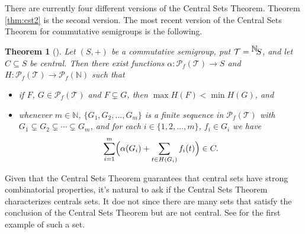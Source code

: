 \documentclass[12pt]{article}
\theoremstyle{plain}
\newtheorem{thm}{Theorem}[section]
\theoremstyle{definition}
\newcommand{\bbN}{\mathbb{N}}
\newcommand{\setfunc}[2]{\hbox{${}^{\hbox{$#1$}}\hskip -2 pt #2$}}
\begin{document}
There are currently four different versions of the Central Sets
Theorem. 
Theorem \ref{thm:cst2} is the second version.
The most recent version of the Central Sets Theorem for
commutative semigroups is the following. 
 \begin{thm}[{\cite[Theorem 2.2]{De:2008uq}}]
    \label{thm:newcst}
    Let $(S,+)$ be a commutative semigroup, put $\mathcal{T} =
    \setfunc{\bbN}{S}$, and let $C \subseteq S$ be central. 
    Then there exist functions $\alpha : \mathcal{P}_f(\mathcal{T})
    \to S$ and $H : \mathcal{P}_f(\mathcal{T}) \to \mathcal{P}_f(\bbN)$ such
    that
      \begin{itemize}
        \item[(1)] if $F$, $G \in \mathcal{P}_f(\mathcal{T})$ and $F
          \subsetneq G$, then $\max H(F) < \min H(G)$, and
        \item[(2)] whenever $m \in \bbN$, $\{ G_1, G_2, \ldots, G_m
          \}$ is a finite sequence in $\mathcal{P}_f(\mathcal{T})$
          with $G_1 \subsetneq G_2 \subsetneq \cdots \subsetneq G_m$,
          and for each $i \in \{1, 2, \ldots, m\}$, $f_i \in G_i$ we
          have
          \[
            \sum_{i=1}^m\Bigl(\alpha(G_i)+\sum_{t \in H(G_i)}
            f_i(t)\Bigr) \in C.
          \]
      \end{itemize}
  \end{thm}
Given that the Central Sets Theorem guarantees that central sets have
strong combinatorial properties, it's natural to ask if the Central
Sets Theorem characterizes centrals sets. 
It doe not since there are many sets that satisfy the conclusion of
the Central Sets Theorem but are not central.
See \cite[Theorem 4.4]{Hindman:1996uq} for the first example of such a
set. 
\end{document}
